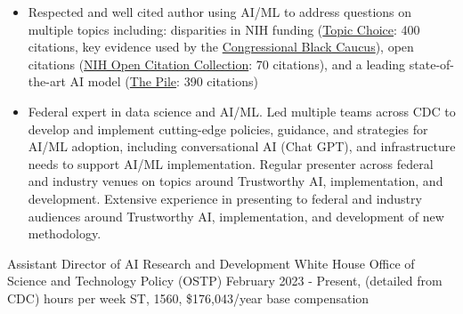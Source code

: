 \documentclass[]{scrartcl}
\begin{document}
\begin{cleanCV}

   \vspace{-1em}

   {
  \vspace{-0.25em}
  \begin{itemize}

      \item Respected and well cited author using AI/ML to address questions on multiple topics including: disparities in NIH funding (\href{https://www.science.org/doi/10.1126/sciadv.aaw7238}{Topic Choice}: 400 citations, key evidence used by the \href{https://bluntrochester.house.gov/uploadedfiles/191220_ltr_to_nih_about_grant_disparities.pdf}{Congressional Black Caucus}), open citations (\href{https://www.ncbi.nlm.nih.gov/pmc/articles/PMC6786512/}{NIH Open Citation Collection}: 70 citations), and a leading state-of-the-art AI model (\href{https://arxiv.org/abs/2101.00027}{The Pile}: 390 citations)

      \item Federal expert in data science and AI/ML. Led multiple teams across CDC to develop and implement cutting-edge policies, guidance, and strategies for AI/ML adoption, including conversational AI (Chat GPT), and infrastructure needs to support AI/ML implementation. Regular presenter across federal and industry venues on topics around Trustworthy AI, implementation, and development. Extensive experience in presenting to federal and industry audiences around Trustworthy AI, implementation, and development of new methodology.

  \end{itemize}
}


  \vspace{-1em}

\WorkExperience
{}
{Assistant Director of AI Research and Development}
{
  \newline White House Office of Science and Technology Policy (OSTP)
  \newline February 2023 - Present, (detailed from CDC)
   hours per week 
  \newline ST, 1560, \$176,043/year base compensation
}
{
  \vspace{-0.25em}
  \begin{itemize}


\end{itemize}}
\end{cleanCV}
\end{document}
